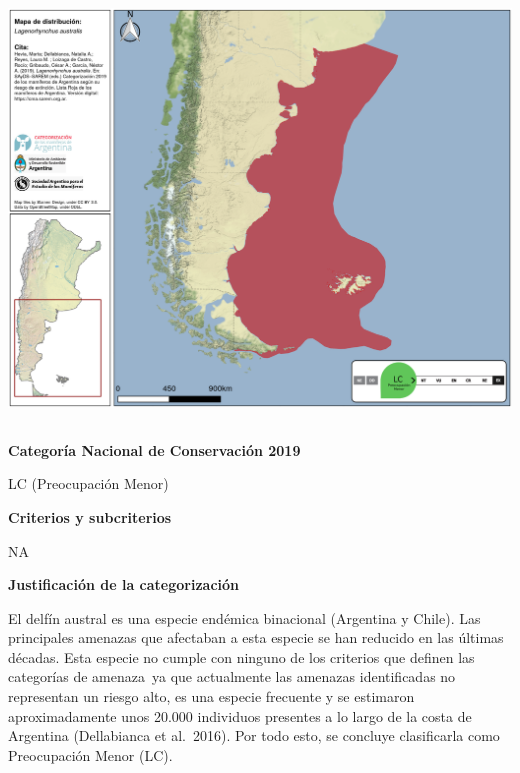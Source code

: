 \documentclass[
  x11names]{article}
\begin{document}
\includegraphics[width=1\linewidth]{maps/Cetartiodactyla/Lagenorhynchus_australis}

%
\begin{table}[H]
\centering
\begin{tabular}[t]{>{\raggedright\arraybackslash}m{16cm}>{}m{16cm}}
\toprule
\cellcolor{ceil}{\textcolor{white}{\textbf{\rule{0pt}{14pt}CATEGORÍAS DE CONSERVACIÓN}}}\\
\bottomrule
\end{tabular}
\end{table}

\vspace{-0.4cm}

\textbf{Categoría Nacional de Conservación 2019}

LC (Preocupación Menor)

\textbf{Criterios y subcriterios}

NA

\textbf{Justificación de la categorización}

El delfín austral es una especie endémica binacional (Argentina y
Chile). Las principales amenazas que afectaban a esta especie se han
reducido en las últimas décadas. Esta especie no cumple con ninguno de
los criterios que definen las categorías de amenaza~ya que actualmente
las amenazas identificadas no representan un riesgo alto, es una especie
frecuente y se estimaron aproximadamente unos 20.000 individuos
presentes a lo largo de la costa de Argentina (Dellabianca et al.~2016).
Por todo esto, se concluye clasificarla como Preocupación Menor (LC).
\end{document}
